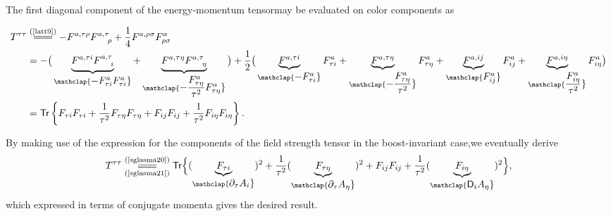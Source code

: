 \begin{note}
The first diagonal component of the energy-momentum tensormay be evaluated on color components as
\begin{fullwidth}
\begin{align*}
   T^{\tau\tau}&\stackrel{(\text{\cref{latt9}})}{=\joinrel=\joinrel=}-F^{a,\tau \rho} F_{\phantom{a,\tau}\rho}^{a,\tau}+\frac{1}{4} F^{a,\rho\sigma} F^a_{\rho\sigma}\\
   &=-\big(\underbrace{F^{a,\tau i}F^{a,\tau}_{\phantom{a,\tau}i}}_{\mathclap{\textstyle-F^a_{\tau i}F^a_{\tau i}}}+\underbrace{F^{a,\tau\eta}F^{a,\tau}_{\phantom{a,\tau}\eta}}_{\mathclap{\textstyle-\dfrac{F^a_{\tau \eta}}{\tau^2}F^a_{\tau \eta}}}\big)+\frac{1}{2}\big(\underbrace{F^{a,\tau i}}_{\mathclap{\textstyle-F^a_{\tau i}}}F^a_{\tau i}+\underbrace{F^{a,\tau\eta}}_{\mathclap{\textstyle-\dfrac{F^a_{\tau\eta}}{\tau^2}}}F^a_{\tau \eta}+\underbrace{F^{a,ij}}_{\mathclap{\textstyle F^a_{ij}}}F^a_{ij}+\underbrace{F^{a,i\eta}}_{\mathclap{\textstyle\dfrac{F^a_{i\eta}}{\tau^2}}}F^a_{i\eta}\big) \\
   &=\textsf{Tr}\left\{F_{\tau i}F_{\tau i}+\frac{1}{\tau^2}F_{\tau\eta}F_{\tau\eta}+F_{ij}F_{ij}+\frac{1}{\tau^2}F_{i\eta}F_{i\eta}\right\}.
\end{align*}
\end{fullwidth}
By making use of the expression for the components of the field strength tensor in the boost-invariant case,we eventually derive
\begin{align*}
    T^{\tau\tau}\underset{(\text{\cref{sglasma21}})}{\stackrel{(\text{\cref{sglasma20}})}{=\joinrel=\joinrel=}}\textsf{Tr}\Big\{(\underbrace{F_{\tau i}}_{\mathclap{\textstyle \partial_\tau A_i}})^2+\frac{1}{\tau^2}(\underbrace{F_{\tau\eta}}_{\mathclap{\textstyle \partial_\tau A_\eta}})^2+F_{ij}F_{ij}+\frac{1}{\tau^2}(\underbrace{F_{i\eta}}_{\mathclap{\textstyle \textsf{D}_iA_\eta}})^2\Big\},
\end{align*}
which expressed in terms of conjugate momenta gives the desired result.

\end{note}

